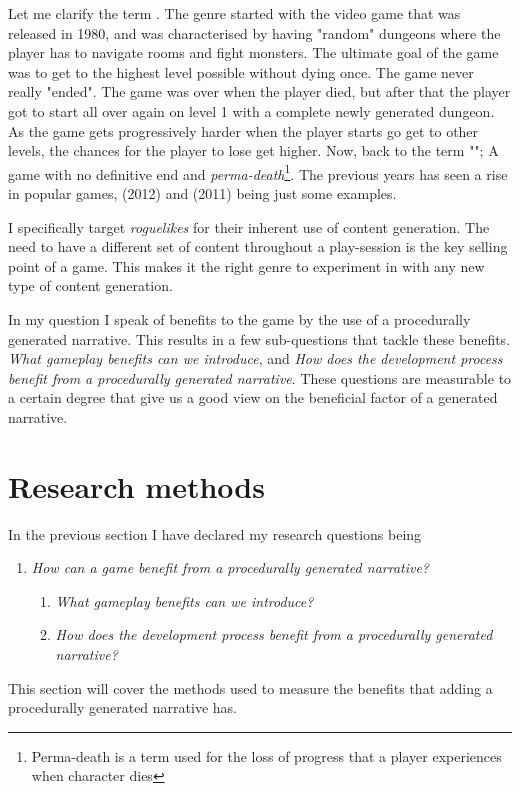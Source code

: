 Let me clarify the term \rogue. The genre started with the video game  that was released in 1980, and was characterised by having "random" dungeons where the player has to navigate rooms and fight monsters. The ultimate goal of the game was to get to the highest level possible without dying once. The game never really "ended". The game was over when the player died, but after that the player got to start all over again on level 1 with a complete newly generated dungeon. As the game gets progressively harder when the player starts go get to other levels, the chances for the player to lose get higher. Now, back to the term "\rogue"; A game with no definitive end and \textit{perma-death}\footnote{Perma-death is a term used for the loss of progress that a player experiences when \his character dies}. 
The previous years has seen a rise in popular \rogue games,  (2012) and  (2011) being just some examples.

I specifically target \textit{roguelikes} for their inherent use of content generation. The need to have a different set of content throughout a play-session is the key selling point of a \rogue game. This makes it the right genre to experiment in with any new type of content generation.

In my question I speak of benefits to the game by the use of a procedurally generated narrative. This results in a few sub-questions that tackle these benefits. \textit{What gameplay benefits can we introduce}, and \textit{How does the development process benefit from a procedurally generated narrative}. These questions are measurable to a certain degree that give us a good view on the beneficial factor of a generated narrative. 

\section{Research methods}
In the previous section I have declared my research questions being
\begin{enumerate}
	\item \textit{How can a \rogue game benefit from a procedurally generated narrative?}
	\begin{enumerate}
	\item \textit{What gameplay benefits can we introduce?} \label{rq:1a}
	\item \textit{How does the development process benefit from a procedurally generated narrative?} \label{rq:2a}
	\end{enumerate}
\end{enumerate}
This section will cover the methods used to measure the benefits that adding a procedurally generated narrative has.

